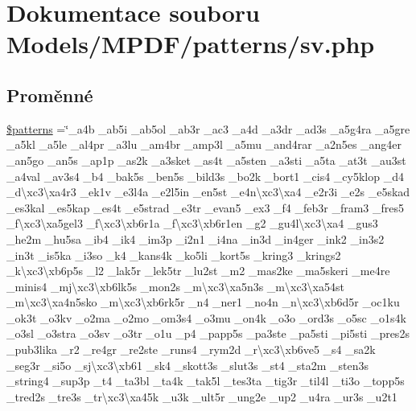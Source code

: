 \hypertarget{sv_8php}{\section{Dokumentace souboru Models/\-M\-P\-D\-F/patterns/sv.php}
\label{sv_8php}
}
\subsection*{Proměnné}
\begin{DoxyCompactItemize}
\item 
\hyperlink{sv_8php_a99c668c59ad650ca9b31ad5313dc5720}{\$patterns} =\char`\"{}\-\_\-a4b \-\_\-ab5i \-\_\-ab5ol \-\_\-ab3r \-\_\-ac3 \-\_\-a4d \-\_\-a3dr \-\_\-ad3s \-\_\-a5g4ra \-\_\-a5gre \-\_\-a5kl \-\_\-a5le \-\_\-al4pr \-\_\-a3lu \-\_\-am4br \-\_\-amp3l \-\_\-a5mu \-\_\-and4rar \-\_\-a2n5es \-\_\-ang4er \-\_\-an5go \-\_\-an5s \-\_\-ap1p \-\_\-as2k \-\_\-a3sket \-\_\-as4t \-\_\-a5sten \-\_\-a3sti \-\_\-a5ta \-\_\-at3t \-\_\-au3st \-\_\-a4val \-\_\-av3s4 \-\_\-b4 \-\_\-bak5s \-\_\-ben5s \-\_\-bild3s \-\_\-bo2k \-\_\-bort1 \-\_\-cis4 \-\_\-cy5klop \-\_\-d4 \-\_\-d\textbackslash{}xc3\textbackslash{}xa4r3 \-\_\-ek1v \-\_\-e3l4a \-\_\-e2l5in \-\_\-en5st \-\_\-e4n\textbackslash{}xc3\textbackslash{}xa4 \-\_\-e2r3i \-\_\-e2s \-\_\-e5skad \-\_\-es3kal \-\_\-es5kap \-\_\-es4t \-\_\-e5strad \-\_\-e3tr \-\_\-evan5 \-\_\-ex3 \-\_\-f4 \-\_\-feb3r \-\_\-fram3 \-\_\-fres5 \-\_\-f\textbackslash{}xc3\textbackslash{}xa5gel3 \-\_\-f\textbackslash{}xc3\textbackslash{}xb6r1a \-\_\-f\textbackslash{}xc3\textbackslash{}xb6r1en \-\_\-g2 \-\_\-gu4l\textbackslash{}xc3\textbackslash{}xa4 \-\_\-gus3 \-\_\-he2m \-\_\-hu5sa \-\_\-ib4 \-\_\-ik4 \-\_\-im3p \-\_\-i2n1 \-\_\-i4na \-\_\-in3d \-\_\-in4ger \-\_\-ink2 \-\_\-in3s2 \-\_\-in3t \-\_\-is5ka \-\_\-i3so \-\_\-k4 \-\_\-kans4k \-\_\-ko5li \-\_\-kort5s \-\_\-kring3 \-\_\-krings2 \-\_\-k\textbackslash{}xc3\textbackslash{}xb6p5s \-\_\-l2 \-\_\-lak5r \-\_\-lek5tr \-\_\-lu2st \-\_\-m2 \-\_\-mas2ke \-\_\-ma5skeri \-\_\-me4re \-\_\-minis4 \-\_\-mj\textbackslash{}xc3\textbackslash{}xb6lk5s \-\_\-mon2s \-\_\-m\textbackslash{}xc3\textbackslash{}xa5n3s \-\_\-m\textbackslash{}xc3\textbackslash{}xa54st \-\_\-m\textbackslash{}xc3\textbackslash{}xa4n5sko \-\_\-m\textbackslash{}xc3\textbackslash{}xb6rk5r \-\_\-n4 \-\_\-ner1 \-\_\-no4n \-\_\-n\textbackslash{}xc3\textbackslash{}xb6d5r \-\_\-oc1ku \-\_\-ok3t \-\_\-o3kv \-\_\-o2ma \-\_\-o2mo \-\_\-om3s4 \-\_\-o3mu \-\_\-on4k \-\_\-o3o \-\_\-ord3s \-\_\-o5sc \-\_\-o1s4k \-\_\-o3sl \-\_\-o3stra \-\_\-o3sv \-\_\-o3tr \-\_\-o1u \-\_\-p4 \-\_\-papp5s \-\_\-pa3ste \-\_\-pa5sti \-\_\-pi5sti \-\_\-pres2s \-\_\-pub3lika \-\_\-r2 \-\_\-re4gr \-\_\-re2ste \-\_\-runs4 \-\_\-rym2d \-\_\-r\textbackslash{}xc3\textbackslash{}xb6ve5 \-\_\-s4 \-\_\-sa2k \-\_\-seg3r \-\_\-si5o \-\_\-sj\textbackslash{}xc3\textbackslash{}xb61 \-\_\-sk4 \-\_\-skott3s \-\_\-slut3s \-\_\-st4 \-\_\-sta2m \-\_\-sten3s \-\_\-string4 \-\_\-sup3p \-\_\-t4 \-\_\-ta3bl \-\_\-ta4k \-\_\-tak5l \-\_\-tes3ta \-\_\-tig3r \-\_\-til4l \-\_\-ti3o \-\_\-topp5s \-\_\-tred2s \-\_\-tre3s \-\_\-tr\textbackslash{}xc3\textbackslash{}xa45k \-\_\-u3k \-\_\-ult5r \-\_\-ung2e \-\_\-up2 \-\_\-u4ra \-\_\-ur3s \-\_\-u2t1 
\end{DoxyCompactItemize}
